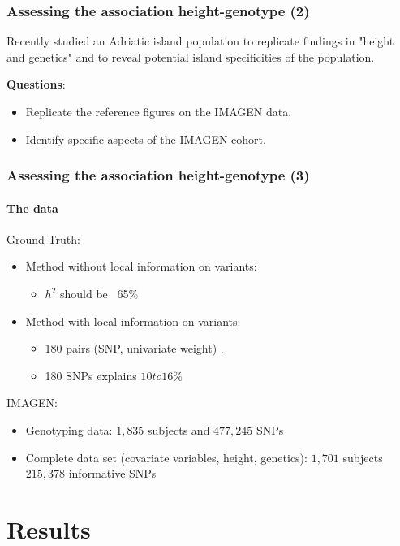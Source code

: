 \documentclass[utf8]{beamer}
\begin{document}
\begin{frame}
\frametitle{Assessing the association height-genotype (2)}
Recently \cite{Zhang2011} studied an Adriatic island population to
replicate findings in "height and genetics" and to reveal potential 
island specificities of the population.

\vspace{1cm}
\textbf{Questions}:
\begin{itemize}
\item Replicate the reference figures on the IMAGEN data,
\item Identify specific aspects of the IMAGEN cohort.
\end{itemize}

\end{frame}

\begin{frame}
\frametitle{Assessing the association height-genotype (3)}
\framesubtitle{The data}
Ground Truth:
\begin{itemize}
	\item Method without local information on variants:
	\begin{itemize}
	\item $h^2$ should be ~65\%
	\end{itemize}
	\item Method with local information on variants:
	\begin{itemize}
	\item 180 pairs (SNP, univariate weight) \cite{LangoAllen2010}.
	\item 180 SNPs explains $10 to 16\%$
	\end{itemize}
\end{itemize}

\vspace{0.5cm}
IMAGEN:
\begin{itemize}
\item Genotyping data: $1,835$ subjects and $477,245$ SNPs
\item Complete data set (covariate variables, height, genetics): 
$1,701$ subjects $215,378$ informative SNPs 
\end{itemize}
\end{frame}



\section{Results}
\end{document}
